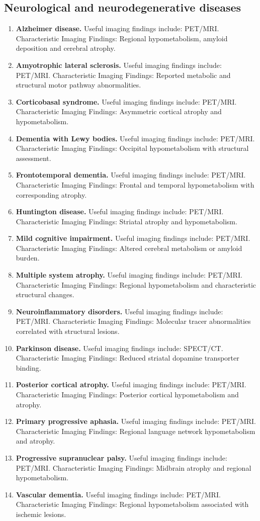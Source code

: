 \subsection{Neurological and neurodegenerative diseases}
\begin{enumerate}[leftmargin=*,itemsep=0.45em,topsep=0.4em]
\item \textbf{Alzheimer disease.} Useful imaging findings include: PET/MRI. Characteristic Imaging Findings: Regional hypometabolism, amyloid deposition and cerebral atrophy.
\item \textbf{Amyotrophic lateral sclerosis.} Useful imaging findings include: PET/MRI. Characteristic Imaging Findings: Reported metabolic and structural motor pathway abnormalities.
\item \textbf{Corticobasal syndrome.} Useful imaging findings include: PET/MRI. Characteristic Imaging Findings: Asymmetric cortical atrophy and hypometabolism.
\item \textbf{Dementia with Lewy bodies.} Useful imaging findings include: PET/MRI. Characteristic Imaging Findings: Occipital hypometabolism with structural assessment.
\item \textbf{Frontotemporal dementia.} Useful imaging findings include: PET/MRI. Characteristic Imaging Findings: Frontal and temporal hypometabolism with corresponding atrophy.
\item \textbf{Huntington disease.} Useful imaging findings include: PET/MRI. Characteristic Imaging Findings: Striatal atrophy and hypometabolism.
\item \textbf{Mild cognitive impairment.} Useful imaging findings include: PET/MRI. Characteristic Imaging Findings: Altered cerebral metabolism or amyloid burden.
\item \textbf{Multiple system atrophy.} Useful imaging findings include: PET/MRI. Characteristic Imaging Findings: Regional hypometabolism and characteristic structural changes.
\item \textbf{Neuroinflammatory disorders.} Useful imaging findings include: PET/MRI. Characteristic Imaging Findings: Molecular tracer abnormalities correlated with structural lesions.
\item \textbf{Parkinson disease.} Useful imaging findings include: SPECT/CT. Characteristic Imaging Findings: Reduced striatal dopamine transporter binding.
\item \textbf{Posterior cortical atrophy.} Useful imaging findings include: PET/MRI. Characteristic Imaging Findings: Posterior cortical hypometabolism and atrophy.
\item \textbf{Primary progressive aphasia.} Useful imaging findings include: PET/MRI. Characteristic Imaging Findings: Regional language network hypometabolism and atrophy.
\item \textbf{Progressive supranuclear palsy.} Useful imaging findings include: PET/MRI. Characteristic Imaging Findings: Midbrain atrophy and regional hypometabolism.
\item \textbf{Vascular dementia.} Useful imaging findings include: PET/MRI. Characteristic Imaging Findings: Regional hypometabolism associated with ischemic lesions.
\end{enumerate}

